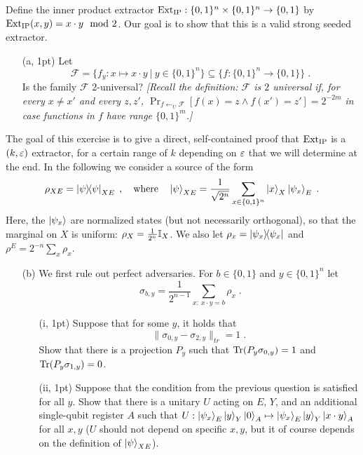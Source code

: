 \documentclass[12pt]{article}
\begin{document}
\begin{enumerate}
Define the inner product extractor $\mathrm{Ext}_{\mathrm{IP}}:\{0,1\}^n\times\{0,1\}^n\to\{0,1\}$ by $\mathrm{Ext}_{\mathrm{IP}}(x,y)=x\cdot y\mod 2$. Our goal is to show that this is a valid strong seeded extractor. 
\begin{enumerate}
\item[(a, 1pt)] Let 
\[\mathcal{F}=\big\{f_y:x\mapsto x\cdot y \ | \ y\in\{0,1\}^n\big\}\subseteq \big\{ f: \{0,1\}^n\to\{0,1\}\big\}\;.\]
Is the family $\mathcal{F}$ $2$-universal? \emph{[Recall the definition: $\mathcal{F}$ is $2$ universal if, for every $x\neq x'$ and every $z,z'$, $\Pr_{f\leftarrow_U \mathcal{F}}[f(x)=z\wedge f(x')=z']=2^{-2m}$ in case functions in $f$ have range $\{0,1\}^m$.]} 
\end{enumerate}
The goal of this exercise is to give a direct, self-contained proof that $\mathrm{Ext}_{\mathrm{IP}}$ is a $(k,\varepsilon)$ extractor, for a certain range of $k$ depending on $\varepsilon$ that we will determine at the end. In the following we consider a source of the form
\[\rho_{XE}=\ket{\psi}\!\!\bra{\psi}_{XE}\;, \quad\text{where}\quad \ket{\psi}_{XE}=\frac{1}{\sqrt{2^n}} \sum_{x\in\{0,1\}^n} \ket{x}_X\ket{\psi_x}_E\;.\]
Here, the $\ket{\psi_x}$ are normalized states (but not necessarily orthogonal), so that the marginal on $X$ is uniform: $\rho_X= \frac{1}{2^n}\mathbb{I}_X$. We also let $\rho_x = \ket{\psi_x}\!\!\bra{\psi_x}$ and $\rho^E = 2^{-n}\sum_x \rho_x$. 
\begin{enumerate}
\item[(b)] We first rule out perfect adversaries. For $b\in\{0,1\}$ and $y\in\{0,1\}^n$ let 
\begin{equation}\label{eq:def-sigma}
\sigma_{b,y} = \frac{1}{2^{n-1}}\sum_{x:\ x\cdot y=b}\rho_x\;.
\end{equation}
 \begin{enumerate}
\item[(i, 1pt)] Suppose that for some $y$, it holds that 
\begin{equation}\label{eq:sigy}
\|\sigma_{0,y}-\sigma_{2,y}\|_{tr}=1\;.
\end{equation}
 Show that there is a projection $P_y$ such that $\mathrm{Tr}(P_y\sigma_{0,y})=1$ and $\mathrm{Tr}(P_y\sigma_{1,y})=0$.
\item[(ii, 1pt)] Suppose that the condition from the previous question is satisfied for all $y$. Show that there is a unitary $U$ acting on $E$, $Y$, and an additional single-qubit register $A$ such that $U:\ket{\psi_x}_E\ket{y}_Y\ket{0}_A \mapsto \ket{\psi_x}_E\ket{y}_Y\ket{x\cdot y}_A$ for all $x,y$ ($U$ should not depend on specific $x,y$, but it of course depends on the definition of $\ket{\psi}_{XE}$).

\end{enumerate}
\end{enumerate}
\end{enumerate}
\end{document}
